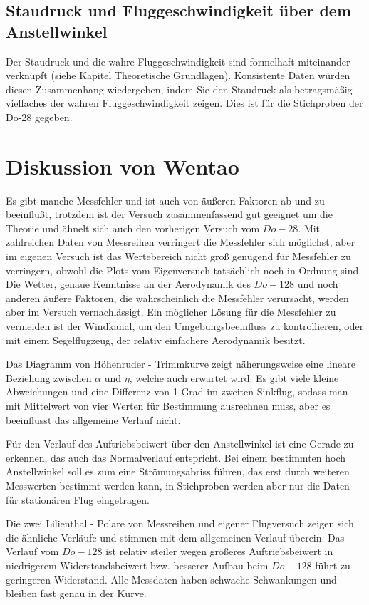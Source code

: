\subsection{Staudruck und Fluggeschwindigkeit über dem Anstellwinkel}
Der Staudruck und die wahre Fluggeschwindigkeit sind formelhaft miteinander verknüpft (siehe Kapitel Theoretische Grundlagen). Konsistente Daten würden diesen Zusammenhang wiedergeben, indem Sie den Staudruck als betragsmäßig vielfaches der wahren Fluggeschwindigkeit zeigen. Dies ist für die Stichproben der Do-28 gegeben.
\newpage

\section{Diskussion von Wentao}
 Es gibt manche Messfehler und ist auch von äußeren Faktoren ab und zu beeinflußt, trotzdem ist der Versuch zusammenfassend gut geeignet um die Theorie und ähnelt sich auch den vorherigen Versuch vom $Do - 28$. Mit zahlreichen Daten von Messreihen verringert die Messfehler sich möglichst, aber im eigenen Versuch ist das Wertebereich nicht groß genügend für Messfehler zu verringern, obwohl die Plots vom Eigenversuch tatsächlich noch in Ordnung sind. Die Wetter, genaue Kenntnisse an der Aerodynamik des $Do -128$ und noch anderen äußere Faktoren, die wahrscheinlich die Messfehler verursacht, werden aber im Versuch vernachlässigt. Ein möglicher Lösung für die Messfehler zu vermeiden ist der Windkanal, um den Umgebungsbeeinfluss zu kontrollieren, oder mit einem Segelflugzeug, der relativ einfachere Aerodynamik besitzt.

Das Diagramm von Höhenruder - Trimmkurve zeigt näherungsweise eine lineare Beziehung zwischen $\alpha$ und $\eta$, welche auch erwartet wird. Es gibt viele kleine Abweichungen und eine Differenz von 1 Grad im zweiten Sinkflug, sodass man mit Mittelwert von vier Werten für Bestimmung ausrechnen muss, aber es beeinflusst das allgemeine Verlauf nicht.

Für den Verlauf des Auftriebsbeiwert über den Anstellwinkel ist eine Gerade zu erkennen, das auch das Normalverlauf entspricht. Bei einem bestimmten hoch Anstellwinkel soll es zum eine Strömungsabriss führen, das erst durch weiteren Messwerten bestimmt werden kann, in Stichproben werden aber nur die Daten für stationären Flug eingetragen.

Die zwei Lilienthal - Polare von Messreihen und eigener Flugversuch zeigen sich die ähnliche Verläufe und stimmen mit dem allgemeinen Verlauf überein. Das Verlauf vom $Do - 128$ ist relativ steiler wegen größeres Auftriebsbeiwert in niedrigerem Widerstandsbeiwert bzw. besserer Aufbau beim $Do - 128$ führt zu geringeren Widerstand. Alle Messdaten haben schwache Schwankungen und bleiben fast genau in der Kurve.

